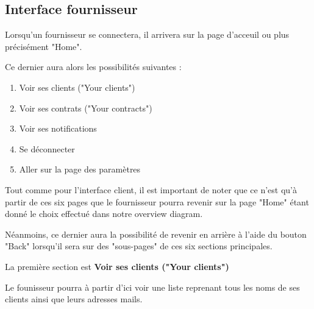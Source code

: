 \newpage
\subsection{Interface fournisseur}

Lorsqu'un fournisseur se connectera, il arrivera sur la page d'acceuil ou plus précisément "Home".
\begin{flushleft}
Ce dernier aura alors les possibilités suivantes :
\end{flushleft}
\begin{enumerate}
\item Voir ses clients ("Your clients")
\item Voir ses contrats ("Your contracts")
\item Voir ses notifications
\item Se déconnecter
\item Aller sur la page des paramètres
\end{enumerate}

\begin{flushleft}
Tout comme pour l'interface client, il est important de noter que ce n'est qu'à partir de ces six pages que le fournisseur pourra revenir sur la page "Home" étant donné le choix effectué dans notre overview diagram.
\end{flushleft}

\begin{flushleft}
Néanmoins, ce dernier aura la possibilité de revenir en arrière à l'aide du bouton "Back" lorsqu'il sera sur des "sous-pages" de ces six sections principales.
\end{flushleft}

\newpage

\begin{flushleft}
La première section est \textbf{Voir ses clients ("Your clients")}
\end{flushleft}

\begin{flushleft}
Le founisseur pourra à partir d'ici voir une liste reprenant tous les noms de ses clients ainsi que leurs adresses mails. 
\end{flushleft}

